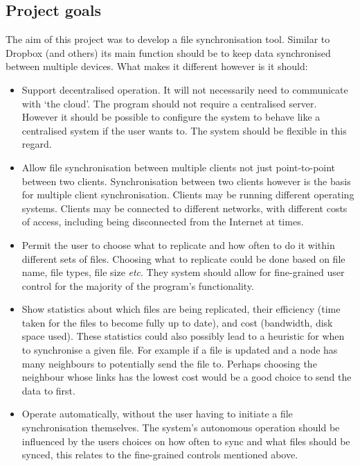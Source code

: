 \documentclass[12pt]{article}
\begin{document}
\subsection{Project goals}
The aim of this project was to develop a file synchronisation tool.
Similar to  Dropbox (and others) its main function should be to
keep data synchronised between multiple devices.
What makes it different however is it should:
\begin{itemize}
\item Support decentralised operation. It will not necessarily need to communicate with
`the cloud'. The program should not require a
centralised server. However it should be
possible to configure the system to behave like a centralised system if the user wants to.
The system should be flexible in this regard.

\item Allow file synchronisation between multiple clients not just point-to-point
between two clients. Synchronisation between two clients however is the
basis for multiple client synchronisation. Clients may be
running different operating systems. Clients may be connected to
different networks, with different costs of access, including being disconnected
from the Internet at times.

\item Permit the user to choose what to replicate and how often to do
it within different sets of files. Choosing what to replicate could be done
based on file name, file types, file size \emph{etc}. They system should
allow for fine-grained user control for the majority of the program's functionality.

\item Show statistics about which files are being replicated, their efficiency (time
taken for the files to become fully up to date),
and cost (bandwidth, disk space used). These statistics could also possibly lead
to a heuristic for when to synchronise a given file. For example if a file is
updated and a node has many neighbours to potentially send the file to. Perhaps
choosing the neighbour whose links has the lowest cost would be a good choice
to send the data to first.

\item Operate automatically, without the user having to initiate a file
synchronisation themselves. 
The system's autonomous operation should be influenced by the users
choices on how often to sync and what files should be synced, this
relates to the fine-grained controls mentioned above.
\end{itemize}
\end{document}
